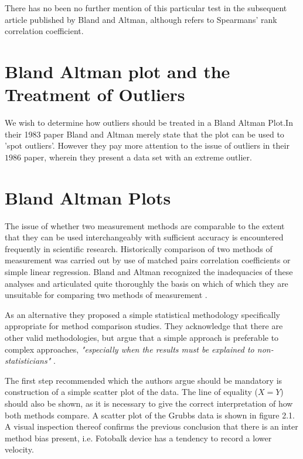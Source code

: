 \documentclass[12pt, a4paper]{report}
\begin{document}
There has no been no further mention of this particular test in
the subsequent article published by Bland and Altman, although
\citet{BA99} refers to Spearmans' rank correlation coefficient.

\section{Bland Altman plot and the Treatment of Outliers}
We wish to determine how outliers should be treated in a Bland
Altman Plot.In their 1983 paper Bland and Altman  merely state
that the plot can be used to 'spot outliers'. However they pay
more attention to the issue of outliers in their $1986$ paper,
wherein they present a data set with an extreme outlier.

\section{Bland Altman Plots}
The issue of whether two measurement methods are comparable to the
extent that they can be used interchangeably with sufficient
accuracy is encountered frequently in scientific research.
Historically comparison of two methods of measurement was carried
out by use of matched pairs correlation coefficients or simple
linear regression. Bland and Altman recognized the inadequacies of
these analyses and articulated quite thoroughly the basis on which
of which they are unsuitable for comparing two methods of
measurement \citep*{BA83}.

As an alternative they proposed a simple statistical methodology
specifically appropriate for method comparison studies. They
acknowledge that there are other valid methodologies, but argue
that a simple approach is preferable to complex approaches,
\emph{"especially when the results must be explained to
non-statisticians"} \citep*{BA83}.

The first step recommended which the authors argue should be
mandatory is construction of a simple scatter plot of the data.
The line of equality ($X=Y$) should also be shown, as it is
necessary to give the correct interpretation of how both methods
compare. A scatter plot of the Grubbs data is shown in figure 2.1.
A visual inspection thereof confirms the previous conclusion that
there is an inter method bias present, i.e. Fotobalk device has a
tendency to record a lower velocity.
\end{document}
